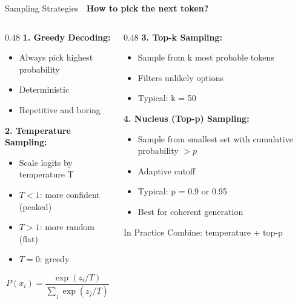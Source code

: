 \documentclass[aspectratio=169]{beamer}
\begin{document}
\begin{frame}{Sampling Strategies 🎲}
\textbf{How to pick the next token?}

\vspace{0.5em}

\begin{columns}[T]
\begin{column}{0.48\textwidth}
\textbf{1. Greedy Decoding:}
\begin{itemize}
    \item Always pick highest probability
    \item Deterministic
    \item \alert{Repetitive and boring}
\end{itemize}

\vspace{0.3em}

\textbf{2. Temperature Sampling:}
\begin{itemize}
    \item Scale logits by temperature T
    \item $T < 1$: more confident (peaked)
    \item $T > 1$: more random (flat)
    \item $T = 0$: greedy
\end{itemize}

$$P(x_i) = \frac{\exp(z_i / T)}{\sum_j \exp(z_j / T)}$$
\end{column}

\begin{column}{0.48\textwidth}
\textbf{3. Top-k Sampling:}
\begin{itemize}
    \item Sample from k most probable tokens
    \item Filters unlikely options
    \item Typical: k = 50
\end{itemize}

\vspace{0.3em}

\textbf{4. Nucleus (Top-p) Sampling:}
\begin{itemize}
    \item Sample from smallest set with cumulative probability $> p$
    \item Adaptive cutoff
    \item Typical: p = 0.9 or 0.95
    \item \alert{Best for coherent generation}
\end{itemize}

\vspace{0.3em}

\begin{exampleblock}{In Practice}
Combine: temperature + top-p
\end{exampleblock}
\end{column}
\end{columns}
\end{frame}
\end{document}
